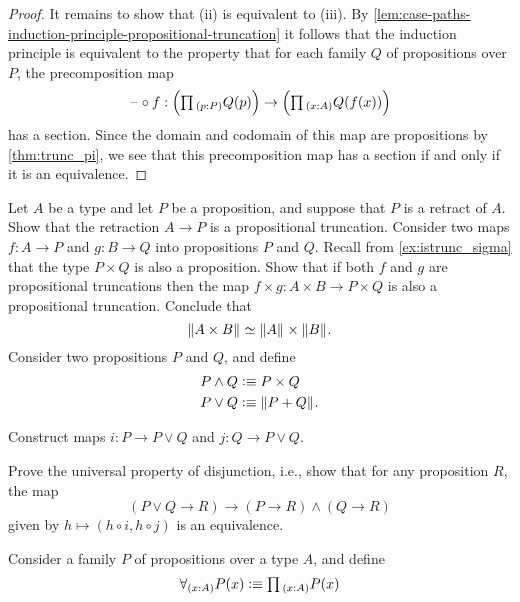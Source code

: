 \begin{proof}
  It remains to show that (ii) is equivalent to (iii). By \cref{lem:case-paths-induction-principle-propositional-truncation} it follows that the induction principle is equivalent to the property that for each family $Q$ of propositions over $P$, the precomposition map
  \begin{equation*}
    \blank\circ f : \Big(\prd{p:P}Q(p)\Big)\to\Big(\prd{x:A}Q(f(x))\Big)
  \end{equation*}
  has a section. Since the domain and codomain of this map are propositions by \cref{thm:trunc_pi}, we see that this precomposition map has a section if and only if it is an equivalence.
\end{proof}

\begin{exercises}
  \exercise Let $A$ be a type and let $P$ be a proposition, and suppose that $P$ is a retract of $A$. Show that the retraction $A\to P$ is a propositional truncation.
  \exercise Consider two maps $f:A\to P$ and $g:B\to Q$ into propositions $P$ and $Q$. Recall from \cref{ex:istrunc_sigma} that the type $P\times Q$ is also a proposition. Show that if both $f$ and $g$ are propositional truncations then the map $f\times g : A\times B\to P\times Q$ is also a propositional truncation. Conclude that
  \begin{equation*}
    \Vert A\times B\Vert_{}\simeq \Vert A\Vert_{}\times\Vert B\Vert_{}. 
  \end{equation*}
  \exercise Consider two propositions $P$ and $Q$, and define
  \begin{align*}
    P\land Q & \vcentcolon\equiv P\times Q\\
    P\vee Q & \vcentcolon\equiv \Vert P+Q\Vert_{}.
  \end{align*}
  \begin{subexenum}
  \item Construct maps $i:P\to P\vee Q$ and $j:Q\to P\vee Q$.
  \item Prove the universal property of disjunction, i.e., show that for any proposition $R$, the map
    \begin{equation*}
      (P\vee Q\to R) \to (P\to R)\land (Q\to R) 
    \end{equation*}
    given by $h\mapsto (h\circ i,h\circ j)$ is an equivalence.
  \end{subexenum}
  \exercise Consider a family $P$ of propositions over a type $A$, and define
  \begin{align*}
    \forall_{(x:A)}P(x) & \defeq \prd{x:A}P(x) \\

\end{align*}
\end{exercises}
